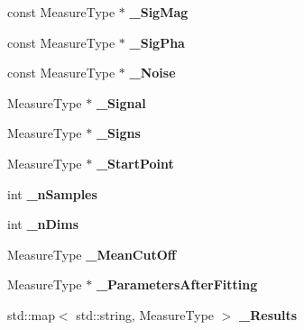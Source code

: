 \begin{DoxyCompactItemize}
\item 
const Measure\+Type $\ast$ {\bfseries \+\_\+\+Sig\+Mag}\hypertarget{class_ox_1_1_calculator_a88a92cc098cedb71d7ab4472375e1a71}{}\label{class_ox_1_1_calculator_a88a92cc098cedb71d7ab4472375e1a71}

\item 
const Measure\+Type $\ast$ {\bfseries \+\_\+\+Sig\+Pha}\hypertarget{class_ox_1_1_calculator_a369ce1a35879f24950dd23af0e14761c}{}\label{class_ox_1_1_calculator_a369ce1a35879f24950dd23af0e14761c}

\item 
const Measure\+Type $\ast$ {\bfseries \+\_\+\+Noise}\hypertarget{class_ox_1_1_calculator_acb769c5cbf95ad5a59ccc1f587c8c421}{}\label{class_ox_1_1_calculator_acb769c5cbf95ad5a59ccc1f587c8c421}

\item 
Measure\+Type $\ast$ {\bfseries \+\_\+\+Signal}\hypertarget{class_ox_1_1_calculator_a5bccc8796af4025d3f072406d839d3a6}{}\label{class_ox_1_1_calculator_a5bccc8796af4025d3f072406d839d3a6}

\item 
Measure\+Type $\ast$ {\bfseries \+\_\+\+Signs}\hypertarget{class_ox_1_1_calculator_a00fec572df90a97f103992d5857c46c3}{}\label{class_ox_1_1_calculator_a00fec572df90a97f103992d5857c46c3}

\item 
Measure\+Type $\ast$ {\bfseries \+\_\+\+Start\+Point}\hypertarget{class_ox_1_1_calculator_a133c4c58f97fd13ffccbc7bb20bbd5e5}{}\label{class_ox_1_1_calculator_a133c4c58f97fd13ffccbc7bb20bbd5e5}

\item 
int {\bfseries \+\_\+n\+Samples}\hypertarget{class_ox_1_1_calculator_a89303af2e5a0bf1f4f8dae5947bfbab0}{}\label{class_ox_1_1_calculator_a89303af2e5a0bf1f4f8dae5947bfbab0}

\item 
int {\bfseries \+\_\+n\+Dims}\hypertarget{class_ox_1_1_calculator_abf7ad737349c2c4f92c25b3a7a02a063}{}\label{class_ox_1_1_calculator_abf7ad737349c2c4f92c25b3a7a02a063}

\item 
Measure\+Type {\bfseries \+\_\+\+Mean\+Cut\+Off}\hypertarget{class_ox_1_1_calculator_a27f0852e7c77218109b9fc3df8b92b07}{}\label{class_ox_1_1_calculator_a27f0852e7c77218109b9fc3df8b92b07}

\item 
Measure\+Type $\ast$ {\bfseries \+\_\+\+Parameters\+After\+Fitting}\hypertarget{class_ox_1_1_calculator_ac17eda39d6e84f26dc2b6f4a9378f686}{}\label{class_ox_1_1_calculator_ac17eda39d6e84f26dc2b6f4a9378f686}

\item 
std\+::map$<$ std\+::string, Measure\+Type $>$ {\bfseries \+\_\+\+Results}\hypertarget{class_ox_1_1_calculator_adae260195d2f056224dbae5e9e34288d}{}\label{class_ox_1_1_calculator_adae260195d2f056224dbae5e9e34288d}

\end{DoxyCompactItemize}


